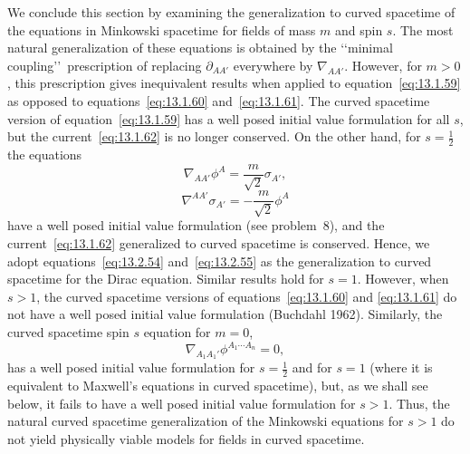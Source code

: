 We conclude this section by examining the generalization to curved spacetime of the
equations in Minkowski spacetime for fields of mass \(m\) and spin \(s\). The most
natural generalization of these equations is obtained by the \lq\lq minimal
coupling\rq\rq\ prescription of replacing \(\partial_{AA'}\) everywhere by
\(\nabla_{AA'}\). However, for \(m>0\), this prescription gives inequivalent
results when applied to equation~\eqref{eq:13.1.59} as opposed to
equations~\eqref{eq:13.1.60} and~\eqref{eq:13.1.61}. The curved spacetime version
of equation~\eqref{eq:13.1.59} has a well posed initial value formulation for all
\(s\), but the current~\eqref{eq:13.1.62} is no longer conserved. On the other
hand, for \(s=\frac12\) the equations
\begin{equation}
  \nabla_{AA'}\phi^A=\frac{m}{\sqrt2}\sigma_{A'},
  \tag{13.2.54}\label{eq:13.2.54}
\end{equation}
\begin{equation}
  \nabla^{AA'}\sigma_{A'}=-\frac{m}{\sqrt2}\phi^A
  \tag{13.2.55}\label{eq:13.2.55}
\end{equation}
have a well posed initial value formulation (see problem~8), and the
current~\eqref{eq:13.1.62} generalized to curved spacetime is conserved. Hence, we
adopt equations~\eqref{eq:13.2.54} and~\eqref{eq:13.2.55} as the generalization to
curved spacetime for the Dirac equation. Similar results hold for \(s=1\). However,
when \(s>1\), the curved spacetime versions of equations~\eqref{eq:13.1.60} and
\eqref{eq:13.1.61} do not have a well posed initial value formulation (Buchdahl
1962). Similarly, the curved spacetime spin \(s\) equation for \(m=0\),
\begin{equation}
  \nabla_{A_1A_1'}\phi^{A_1\cdots A_n}=0,
  \tag{13.2.56}\label{eq:13.2.56}
\end{equation}
has a well posed initial value formulation for \(s=\frac12\) and for \(s=1\) (where
it is equivalent to Maxwell's equations in curved spacetime), but, as we shall see
below, it fails to have a well posed initial value formulation for \(s>1\). Thus, the
natural curved spacetime generalization of the Minkowski equations for \(s>1\) do
not yield physically viable models for fields in curved spacetime.

